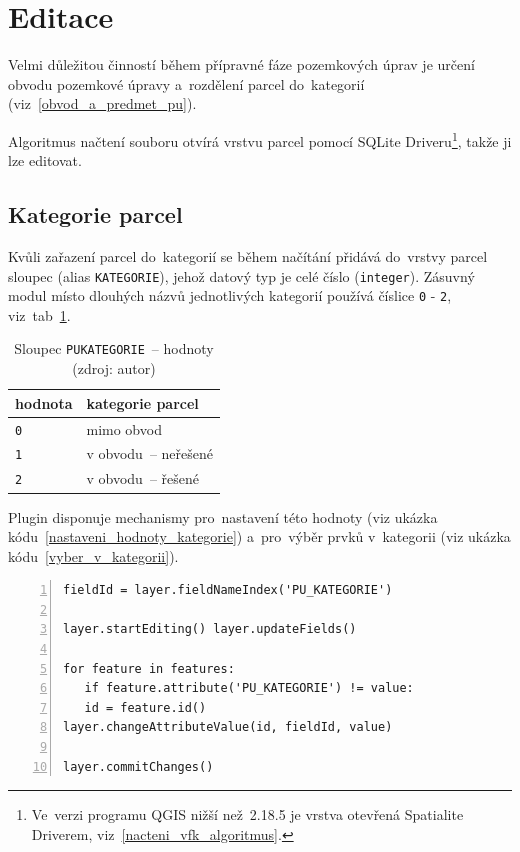 \newpage

\section{Editace}
\label{editace}

Velmi důležitou činností během přípravné fáze pozemkových úprav je
určení obvodu pozemkové úpravy a~rozdělení parcel do~kategorií
(viz~\ref{obvod_a_predmet_pu}).

Algoritmus načtení  souboru otvírá vrstvu parcel pomocí SQLite
Driveru\footnote{Ve~verzi programu QGIS nižší než~2.18.5 je vrstva
otevřená Spatialite Driverem, viz~\ref{nacteni_vfk_algoritmus}.},
takže ji lze editovat.

\subsection{Kategorie parcel}
\label{kategorie_parcel}

Kvůli zařazení parcel do~kategorií se během načítání přidává do~vrstvy
parcel sloupec \texttt{} (alias
\texttt{KATEGORIE}), jehož datový typ je celé číslo
(\texttt{integer}). Zásuvný modul místo dlouhých názvů jednotlivých
kategorií používá číslice \texttt{0} - \texttt{2},
viz~tab~\ref{tab:kategorie_hodnoty}.

\begin{table}[H]
    \begin{tabular}{|l|l|} \hline hodnota & kategorie parcel \\ \hline
\hline \texttt{0} & mimo obvod \\ \hline \texttt{1} & v obvodu~–
neřešené \\ \hline \texttt{2} & v obvodu~– řešené \\ \hline
    \end{tabular} \centering
    \caption[Sloupec \texttt{PU\textunderscore KATEGORIE}~–
hodnoty]{Sloupec \texttt{PU\textunderscore KATEGORIE}~– hodnoty (zdroj: autor)}
    \label{tab:kategorie_hodnoty}
\end{table}

Plugin disponuje mechanismy pro~nastavení této hodnoty (viz ukázka
kódu~\ref{nastaveni_hodnoty_kategorie}) a~pro~výběr prvků v~kategorii
(viz ukázka kódu~\ref{vyber_v_kategorii}).

{\scriptsize
\begin{lstlisting}[style=python, caption={Kategorie parcel~– nastavení
hodnoty}, captionpos=b, label=nastaveni_hodnoty_kategorie,
backgroundcolor = \color{light-gray}, numbers=left]
fieldId = layer.fieldNameIndex('PU_KATEGORIE')

layer.startEditing() layer.updateFields()

for feature in features:
   if feature.attribute('PU_KATEGORIE') != value:
   id = feature.id()
layer.changeAttributeValue(id, fieldId, value)

layer.commitChanges()
\end{lstlisting}}

